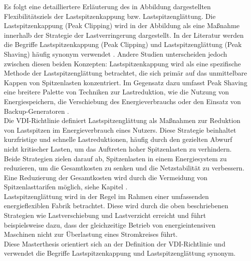 Es folgt eine detailliertere Erläuterung des in Abbildung  dargestellten Flexibilitätsziels der Lastspitzenkappung bzw. Lastspitzenglättung. Die Lastspitzenkappung (Peak Clipping) wird in der Abbildung  als eine Maßnahme innerhalb der Strategie der Lastverringerung dargestellt. In der Literatur werden die Begriffe Lastspitzenkappung (Peak Clipping) und Lastspitzenglättung (Peak Shaving) häufig synonym verwendet \cite{fuhrlander-volkerAutomationArchitectureDemand, dahiruComprehensiveReviewDemand2023, dharaniLoadShiftingPeak2021, waltherMethodologyClassificationCharacterisation2022}. Andere Studien unterscheiden jedoch zwischen diesen beiden Konzepten: Lastspitzenkappung wird als eine spezifische Methode der Lastspitzenglättung betrachtet, die sich primär auf das unmittelbare Kappen von Spitzenlasten konzentriert. Im Gegensatz dazu umfasst Peak Shaving eine breitere Palette von Techniken zur Lastreduktion, wie die Nutzung von Energiespeichern, die Verschiebung des Energieverbrauchs oder den Einsatz von Backup-Generatoren \cite{dharaniLoadShiftingPeak2021}.\\

Die VDI-Richtlinie \cite{VDI5207Blatt2020} definiert Lastspitzenglättung als Maßnahmen zur Reduktion von Lastspitzen im Energieverbrauch eines Nutzers. Diese Strategie beinhaltet kurzfristige und schnelle Lastreduktionen, häufig durch den gezielten Abwurf nicht kritischer Lasten, um das Auftreten hoher Spitzenlasten zu verhindern. Beide Strategien zielen darauf ab, Spitzenlasten in einem Energiesystem zu reduzieren, um die Gesamtkosten zu senken und die Netzstabilität zu verbessern. Eine Reduzierung der Gesamtkosten wird durch die Vermeidung von Spitzenlasttarifen möglich, siehe Kapitel .\\

Lastspitzenglättung wird in der Regel im Rahmen einer umfassenden energieflexiblen Fabrik betrachtet. Diese wird durch die oben beschriebenen Strategien wie Lastverschiebung und Lastverzicht erreicht und führt beispielsweise dazu, dass der gleichzeitige Betrieb von energieintensiven Maschinen nicht zur Überlastung eines Stromkreises führt.\\

Diese Masterthesis orientiert sich an der Definition der VDI-Richtlinie \cite{VDI5207Blatt2020} und verwendet die Begriffe Lastspitzenkappung und Lastspitzenglättung synonym.


